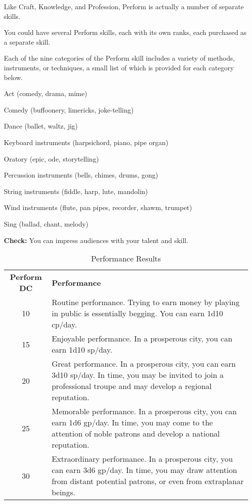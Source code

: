 
Like Craft, Knowledge, and Profession, Perform is actually a number of separate 
skills.

You could have several Perform skills, each with its own ranks, each purchased 
as a separate skill.

Each of the nine categories of the Perform skill includes a variety of methods, 
instruments, or techniques, a small list of which is provided for each category 
below.

\begin{itemize*}
\item Act (comedy, drama, mime)
\item Comedy (buffoonery, limericks, joke-telling)
\item Dance (ballet, waltz, jig)
\item Keyboard instruments (harpsichord, piano, pipe organ)
\item Oratory (epic, ode, storytelling)
\item Percussion instruments (bells, chimes, drums, gong)
\item String instruments (fiddle, harp, lute, mandolin)
\item Wind instruments (flute, pan pipes, recorder, shawm, trumpet)
\item Sing (ballad, chant, melody)
\end{itemize*}

\textbf{Check:} You can impress audiences with your talent and skill.

\begin{table}[htb]
\caption{Performance Results}
\centering
\begin{tabular}{c p{12cm}}
\textbf{Perform DC} & \textbf{Performance}\\
10 & Routine performance. Trying to earn money by playing in public is essentially begging. You can earn 1d10 cp/day.\\
15 & Enjoyable performance. In a prosperous city, you can earn 1d10 sp/day.\\
20 & Great performance. In a prosperous city, you can earn 3d10 sp/day. In time, you may be invited to join a professional troupe and may develop a regional reputation.\\
25 & Memorable performance. In a prosperous city, you can earn 1d6 gp/day. In time, you may come to the attention of noble patrons and develop a national reputation.\\
30 & Extraordinary performance. In a prosperous city, you can earn 3d6 gp/day. In time, you may draw attention from distant potential patrons, or even from extraplanar beings.\\
\end{tabular}
\end{table}

